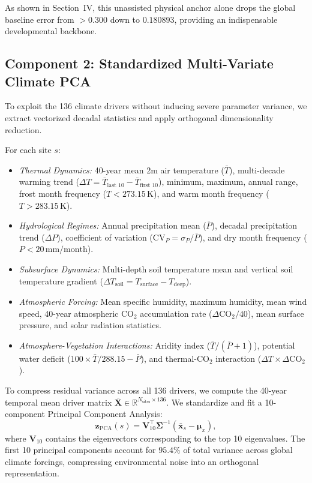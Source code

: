 \documentclass[conference]{IEEEtran}
\begin{document}
As shown in Section~IV, this unassisted physical anchor alone drops the global baseline error from $>0.300$ down to $0.180893$, providing an indispensable developmental backbone.

\subsection{Component 2: Standardized Multi-Variate Climate PCA}
To exploit the 136 climate drivers without inducing severe parameter variance, we extract vectorized decadal statistics and apply orthogonal dimensionality reduction.

For each site $s$:
\begin{itemize}
    \item \textit{Thermal Dynamics:} 40-year mean 2m air temperature ($\bar{T}$), multi-decade warming trend ($\Delta T = \bar{T}_{\text{last 10}} - \bar{T}_{\text{first 10}}$), minimum, maximum, annual range, frost month frequency ($T < 273.15\,\text{K}$), and warm month frequency ($T > 283.15\,\text{K}$).
    \item \textit{Hydrological Regimes:} Annual precipitation mean ($\bar{P}$), decadal precipitation trend ($\Delta P$), coefficient of variation ($\text{CV}_P = \sigma_P / \bar{P}$), and dry month frequency ($P < 20\,\text{mm/month}$).
    \item \textit{Subsurface Dynamics:} Multi-depth soil temperature mean and vertical soil temperature gradient ($\Delta T_{\text{soil}} = T_{\text{surface}} - T_{\text{deep}}$).
    \item \textit{Atmospheric Forcing:} Mean specific humidity, maximum humidity, mean wind speed, 40-year atmospheric $\text{CO}_2$ accumulation rate ($\Delta \text{CO}_2 / 40$), mean surface pressure, and solar radiation statistics.
    \item \textit{Atmosphere-Vegetation Interactions:} Aridity index ($\bar{T} / (\bar{P} + 1)$), potential water deficit ($100 \times \bar{T} / 288.15 - \bar{P}$), and thermal-$\text{CO}_2$ interaction ($\Delta T \times \Delta \text{CO}_2$).
\end{itemize}

To compress residual variance across all 136 drivers, we compute the 40-year temporal mean driver matrix $\bar{\mathbf{X}} \in \mathbb{R}^{N_{\text{sites}} \times 136}$. We standardize and fit a 10-component Principal Component Analysis:
\begin{equation}
    \mathbf{z}_{\text{PCA}}(s) = \mathbf{V}_{10}^\top \mathbf{\Sigma}^{-1} \left( \bar{\mathbf{x}}_s - \boldsymbol{\mu}_x \right),
\end{equation}
where $\mathbf{V}_{10}$ contains the eigenvectors corresponding to the top 10 eigenvalues. The first 10 principal components account for $95.4\%$ of total variance across global climate forcings, compressing environmental noise into an orthogonal representation.
\end{document}
